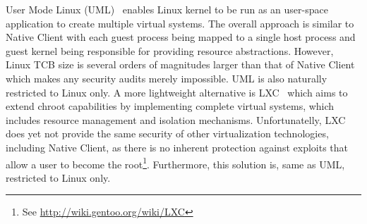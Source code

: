 User Mode Linux (UML)~\cite{dike:uml06} enables Linux kernel to be run as
an user-space application to create multiple virtual systems. The
overall approach is similar to Native Client with each guest process being
mapped to a single host process and guest kernel being responsible for
providing resource abstractions. However, Linux TCB size is several
orders of magnitudes larger than that of Native Client which makes any
security audits merely impossible. UML is also naturally restricted to
Linux only. A more lightweight alternative is LXC~\cite{lxc} which aims
to extend chroot capabilities by implementing complete virtual systems,
which includes resource management and isolation mechanisms.
Unfortunatelly, LXC does yet not provide the same security of other
virtualization technologies, including Native Client, as there is no
inherent protection against exploits that allow a user to become the
root\footnote{See \url{http://wiki.gentoo.org/wiki/LXC}}. Furthermore,
this solution is, same as UML, restricted to Linux only. 



